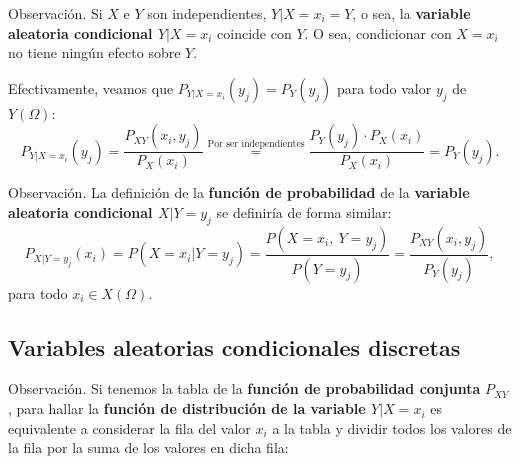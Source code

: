 \documentclass[]{book}
\begin{document}
Observación.
Si \(X\) e \(Y\) son independientes, \(Y|X=x_i =Y\), o sea, la \textbf{variable aleatoria condicional \(Y|X=x_i\)} coincide con \(Y\). O sea, condicionar con \(X=x_i\) no tiene ningún efecto sobre \(Y\).

Efectivamente, veamos que \(P_{Y|X=x_i}(y_j)=P_Y(y_j)\) para todo valor \(y_j\) de \(Y(\Omega)\):
\[
P_{Y|X=x_i}(y_j) =\frac{P_{XY}(x_i,y_j)}{P_X(x_i)} \stackrel{\mbox{Por ser independientes}}{=}\frac{P_Y(y_j)\cdot P_X(x_i)}{P_X(x_i)}=P_Y(y_j).
\]

Observación.
La definición de la \textbf{función de probabilidad} de la \textbf{variable aleatoria condicional \(X|Y=y_j\)} se definiría de forma similar:
\[
P_{X|Y=y_j}(x_i)=P(X=x_i|Y=y_j)=\frac{P(X=x_i,\ Y=y_j)}{P(Y=y_j)}=\frac{P_{XY}(x_i,y_j)}{P_Y(y_j)}, 
\]
para todo \(x_i\in X(\Omega)\).

\hypertarget{variables-aleatorias-condicionales-discretas-4}{%
\subsection{Variables aleatorias condicionales discretas}\label{variables-aleatorias-condicionales-discretas-4}}

Observación.
Si tenemos la tabla de la \textbf{función de probabilidad conjunta} \(P_{XY}\), para hallar la \textbf{función de distribución de la variable \(Y|X=x_i\)} es equivalente a considerar la fila del valor \(x_i\) a la tabla y dividir todos los valores de la fila por la suma de los valores en dicha fila:
\end{document}
